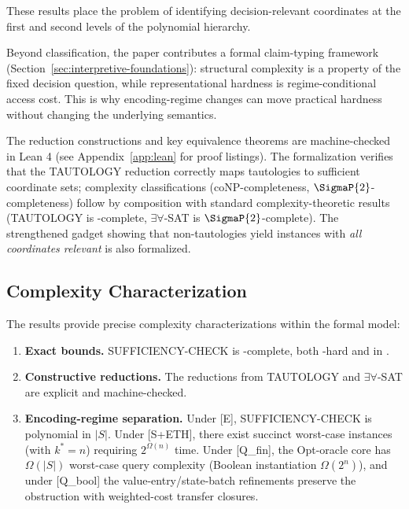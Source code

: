 These results place the problem of identifying decision-relevant coordinates at the first and second levels of the polynomial hierarchy.

Beyond classification, the paper contributes a formal claim-typing framework (Section~\ref{sec:interpretive-foundations}): structural complexity is a property of the fixed decision question, while representational hardness is regime-conditional access cost. This is why encoding-regime changes can move practical hardness without changing the underlying semantics.

The reduction constructions and key equivalence theorems are machine-checked in Lean 4 (see Appendix~\ref{app:lean} for proof listings). The formalization verifies that the TAUTOLOGY reduction correctly maps tautologies to sufficient coordinate sets; complexity classifications (coNP-completeness, $\SigmaP{2}$-completeness) follow by composition with standard complexity-theoretic results (TAUTOLOGY is \coNP-complete, $\exists\forall$-SAT is $\SigmaP{2}$-complete). The strengthened gadget showing that non-tautologies yield instances with \emph{all coordinates relevant} is also formalized.

\subsection*{Complexity Characterization}

The results provide precise complexity characterizations within the formal model:

\begin{enumerate}
\item \textbf{Exact bounds.} SUFFICIENCY-CHECK is \coNP-complete, both \coNP-hard and in \coNP.

\item \textbf{Constructive reductions.} The reductions from TAUTOLOGY and $\exists\forall$-SAT are explicit and machine-checked.

\item \textbf{Encoding-regime separation.} Under [E], SUFFICIENCY-CHECK is polynomial in $|S|$. Under [S+ETH], there exist succinct worst-case instances (with $k^*=n$) requiring $2^{\Omega(n)}$ time. Under [Q\_fin], the Opt-oracle core has $\Omega(|S|)$ worst-case query complexity (Boolean instantiation $\Omega(2^n)$), and under [Q\_bool] the value-entry/state-batch refinements preserve the obstruction with weighted-cost transfer closures.
\end{enumerate}

